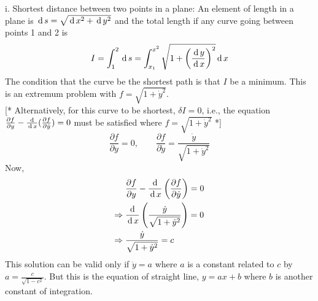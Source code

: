 \documentclass[12pt]{article}
\begin{document}
\begin{soln}
    i. Shortest distance between two points in a plane: An element of length in a plane is \(\,\mathrm{d}\, s=\sqrt{\,\mathrm{d}\, x^2+\,\mathrm{d}\, y^2}\) and the total length if any curve going between points 1 and 2 is 
    \[I=\int_1^2 \,\mathrm{d}\, s=\int_{x_1}^{x^2}\sqrt{1+\left(\frac{\,\mathrm{d}\, y}{\,\mathrm{d}\, x}\right)^2}\,\mathrm{d}\, x\]
    The condition that the curve be the shortest path is that \(I\) be a minimum. This is an extremum problem with \(f=\sqrt{1+\dot{y}^2}\).\\
    {[* Alternatively, for this curve to be shortest, \(\delta I=0\), i.e., the equation \(\frac{\partial f}{\partial y}-\frac{\,\mathrm{d}\, }{\,\mathrm{d}\, x}(\frac{\partial f}{\partial \dot{y}})=0\) must be satisfied where \(f=\sqrt{1+\dot{y}^2}\) *]}
    \[\frac{\partial f}{\partial y}=0,\qquad \frac{\partial f}{\partial \dot{y}}=\frac{\dot{y}}{\sqrt{1+\dot{y}^2}}\]
    Now,
    \begin{align*}
        &\frac{\partial f}{\partial y}-\frac{\,\mathrm{d}\, }{\,\mathrm{d}\, x}\left(\frac{\partial f}{\partial \dot{y}}\right)=0\\
        \Rightarrow\; &\frac{\,\mathrm{d}\, }{\,\mathrm{d}\, x}\left(\frac{\dot{y}}{\sqrt{1+\dot{y}^2}}\right)=0\\
        \Rightarrow\; &\frac{\dot{y}}{\sqrt{1+\dot{y}^2}}=c
    \end{align*}
    This solution can be valid only if \(\dot{y}=a\) where \(a\) is a constant related to \(c\) by \(a=\frac{c}{\sqrt{1-c^2}}\). But this is the equation of straight line, \(y=ax+b\) where \(b\) is another constant of integration.\\



\end{soln}
\end{document}
